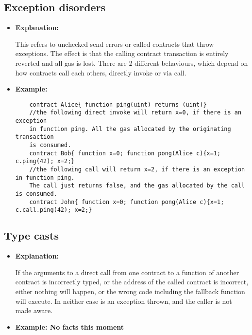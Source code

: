 \documentclass{llncs}
\begin{document}
\subsection{Exception disorders}
\begin{itemize}
\item \textbf{Explanation:} 

This refers to unchecked send errors or called contracts that throw exceptions. The effect is that the calling contract transaction is entirely reverted and all gas is lost. There are 2 different behaviours, which depend on how contracts call each others, directly invoke or via call.
\item \textbf{Example:}

	\begin{minipage}{1.5\textwidth} 
	{\scriptsize
	\begin{verbatim}
	contract Alice{ function ping(uint) returns (uint)}
	//the following direct invoke will return x=0, if there is an exception 
	in function ping. All the gas allocated by the originating transaction 
	is consumed.
	contract Bob{ function x=0; function pong(Alice c){x=1; c.ping(42); x=2;}
	//the following call will return x=2, if there is an exception in function ping. 
	The call just returns false, and the gas allocated by the call is consumed.
	contract John{ function x=0; function pong(Alice c){x=1; c.call.ping(42); x=2;}

	\end{verbatim} }
\end{minipage}	
	
\end{itemize}

\subsection{Type casts}
\begin{itemize}
\item \textbf{Explanation:} 

If the arguments to a direct call from one contract to a function of another contract is incorrectly typed, or the address of the called contract is incorrect, either nothing will happen, or the wrong code including the fallback function will execute. In neither case is an exception thrown, and the caller is not made aware.
\item \textbf{Example: No facts this moment}

\end{itemize}
\end{document}
